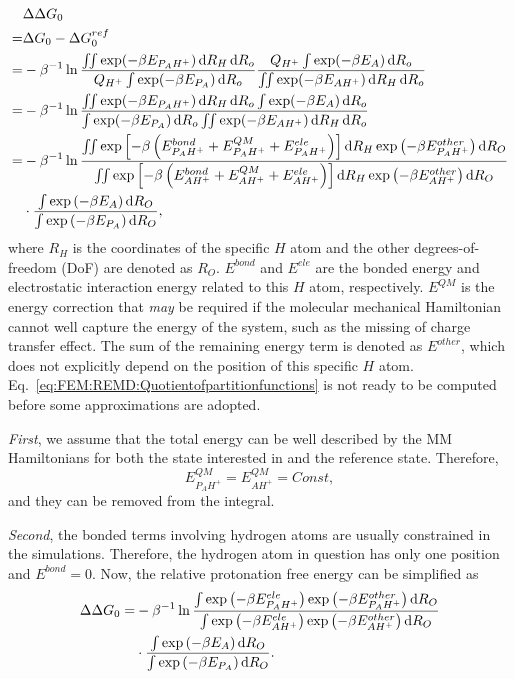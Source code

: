 \begin{align}
	&\Delta\Delta G_{0}\nonumber\\
	= & \Delta G_{0}-\Delta G_{0}^{ref}\nonumber \\
	= & -\beta^{-1}\ln\frac{\iint\exp(-\beta E_{P_{A}H^{+}})\diff R_{H}\diff R_{o}}{Q_{H^{+}}\int\exp(-\beta E_{P_{A}})\diff R_{o}}\frac{Q_{H^{+}}\int\exp(-\beta E_{A})\diff R_{o}}{\iint\exp(-\beta E_{AH^{+}})\diff R_{H}\diff R_{o}}\nonumber \\
	= & -\beta^{-1}\ln\frac{\iint\exp(-\beta E_{P_{A}H^{+}})\diff R_{H}\diff R_{o}\int\exp(-\beta E_{A})\diff R_{o}}{\int\exp(-\beta E_{P_{A}})\diff R_{o}\iint\exp(-\beta E_{AH^{+}})\diff R_{H}\diff R_{o}}\nonumber \\
	= & -\beta^{-1}\ln\frac{\iint\exp{\left[-\beta \left(E_{P_{A}H^{+}}^{bond}+E_{P_{A}H^{+}}^{QM}+E_{P_{A}H^{+}}^{ele}\right)\right]}\diff R_{H}\exp\left(-\beta E_{P_{A}H^{+}}^{other}\right)\diff R_{O}}{\iint\exp\left[-\beta \left(E_{AH^{+}}^{bond}+E_{AH^{+}}^{QM}+E_{AH^{+}}^{ele}\right)\right]\diff R_{H}\exp\left(-\beta E_{AH^{+}}^{other}\right)\diff R_{O}}\nonumber \\
	 & \cdot\frac{\int\exp\left(-\beta E_{A}\right)\diff R_{O}}{\int\exp\left(-\beta E_{P_{A}}\right)\diff R_{O}},\label{eq:FEM:REMD:Quotientofpartitionfunctions}
\end{align}
where $R_{H}$ is the coordinates of the specific $H$ atom and the
other degrees-of-freedom (DoF) are denoted as $R_{O}$. $E^{bond}$
and $E^{ele}$ are the bonded energy and electrostatic interaction
energy related to this $H$ atom, respectively. $E^{QM}$ is the energy
correction that \textit{may} be required if the molecular mechanical
Hamiltonian cannot well capture the energy of the system, such as
the missing of charge transfer effect. The sum of the remaining energy
term is denoted as $E^{other}$, which does not explicitly depend
on the position of this specific $H$ atom. Eq.~\ref{eq:FEM:REMD:Quotientofpartitionfunctions}
is not ready to be computed before some approximations are adopted. 

\textit{First}, we assume that the total energy can be well described by the MM Hamiltonians
for both the state interested in and the reference state. Therefore,
\[
E_{P_{A}H^{+}}^{QM}=E_{AH^{+}}^{QM}=Const,
\]
and they can be removed from the integral. 

\textit{Second}, the bonded terms involving hydrogen atoms are usually 
constrained in the simulations. Therefore, the hydrogen atom in question has 
only one position and $E^{bond}=0$. Now, the 
relative protonation free energy can be simplified as
\begin{align}
\Delta\Delta G_{0}=&-\beta^{-1}\ln\frac{\int\exp\left(-\beta E_{P_{A}H^{+}}^{ele}\right)\exp\left(-\beta E_{P_{A}H^{+}}^{other}\right)\mathop{}\!\mathrm{d} R_{O}}{\int\exp\left(-\beta E_{AH^{+}}^{ele}\right)\exp\left(-\beta E_{AH^{+}}^{other}\right)\mathop{}\!\mathrm{d} R_{O}}\notag\\
&\cdot\frac{\int\exp\left(-\beta E_{A}\right)\mathop{}\!\mathrm{d} R_{O}}{\int\exp\left(-\beta E_{P_{A}}\right)\mathop{}\!\mathrm{d} R_{O}}.
\end{align}

